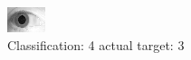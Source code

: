 \begin{figure}[h!]
\begin{center}
\includegraphics[width=0.60\columnwidth]{figures/ID1837_class_4_target_3.png}
\end{center}
\caption{ Classification: 4 actual target: 3}
\label{fig:ID1837_class_4_target_3}
\end{figure}
